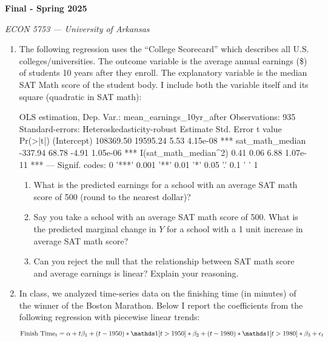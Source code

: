 \documentclass[12pt]{article}
\begin{document}
\begin{center}
{\Huge\bf Final - Spring 2025}

\smallskip
{\large\it ECON 5753 — University of Arkansas}
\end{center}

\vspace{5mm}
\begin{enumerate}
  \item The following regression uses the ``College Scorecard'' which describes all U.S. colleges/universities. The outcome variable is the average annual earnings (\$) of students 10 years after they enroll. The explanatory variable is the median SAT Math score of the student body. I include both the variable itself and its square (quadratic in SAT math):
  \begin{codeblock}[{}]
OLS estimation, Dep. Var.: mean_earnings_10yr_after
Observations: 935
Standard-errors: Heteroskedasticity-robust
                       Estimate   Std. Error  t value   Pr(>|t|)
(Intercept)           108369.50     19595.24     5.53   4.15e-08 ***
sat_math_median         -337.94        68.78    -4.91   1.05e-06 ***
I(sat_math_median^2)       0.41         0.06     6.88   1.07e-11 ***
---
Signif. codes:  0 '***' 0.001 '**' 0.01 '*' 0.05 '.' 0.1 ' ' 1
  \end{codeblock}

  \begin{enumerate}[leftmargin = 2em]
    \item What is the predicted earnings for a school with an average SAT math score of 500 (round to the nearest dollar)?

    \item Say you take a school with an average SAT math score of 500. What is the predicted marginal change in $Y$ for a school with a 1 unit increase in average SAT math score?

    \item Can you reject the null that the relationship between SAT math score and average earnings is linear? Explain your reasoning.
  \end{enumerate}

  \newpage
  \item In class, we analyzed time-series data on the finishing time (in minutes) of the winner of the Boston Marathon. Below I report the coefficients from the following regression with piecewise linear trends:
  \vspace*{-\bigskipamount}
  $$
    \text{Finish Time}_t = \alpha + t \beta_1 + (t - 1950) * \one{t > 1950} * \beta_2 + (t - 1980) * \one{t > 1980} * \beta_3 + \epsilon_t
  $$


\end{enumerate}
\end{document}
